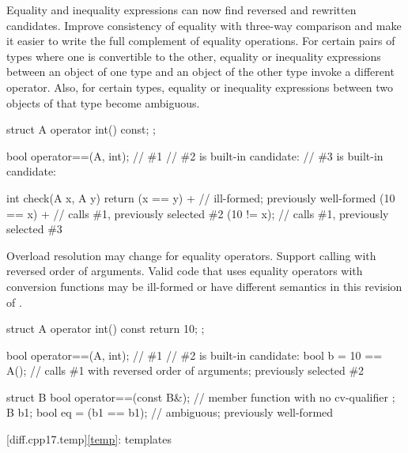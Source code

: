 \change
Equality and inequality expressions can now find
reversed and rewritten candidates.
\rationale
Improve consistency of equality with three-way comparison
and make it easier to write the full complement of equality operations.
\effect
For certain pairs of types where one is convertible to the other,
equality or inequality expressions between an object of one type
and an object of the other type invoke a different operator.
Also, for certain types, equality or inequality expressions
between two objects of that type become ambiguous.
\begin{example}
\begin{codeblock}
struct A {
  operator int() const;
};

bool operator==(A, int);        // \#1
// \#2 is built-in candidate: 
// \#3 is built-in candidate: 

int check(A x, A y) {
  return (x == y) +             // ill-formed; previously well-formed
    (10 == x) +                 // calls \#1, previously selected \#2
    (10 != x);                  // calls \#1, previously selected \#3
}
\end{codeblock}
\end{example}

\change
Overload resolution may change for equality operators.
\rationale
Support calling  with reversed order of arguments.
\effect
Valid \CppXVII{} code that uses equality operators with conversion functions
may be ill-formed or have different semantics in this revision of \Cpp{}.
\begin{example}
\begin{codeblock}
struct A {
  operator int() const { return 10; }
};

bool operator==(A, int);        // \#1
// \#2 is built-in candidate: 
bool b = 10 == A();             // calls \#1 with reversed order of arguments; previously selected \#2

struct B {
  bool operator==(const B&);    // member function with no cv-qualifier
};
B b1;
bool eq = (b1 == b1);           // ambiguous; previously well-formed
\end{codeblock}
\end{example}

[diff.cpp17.temp]{\ref*{temp}: templates}

